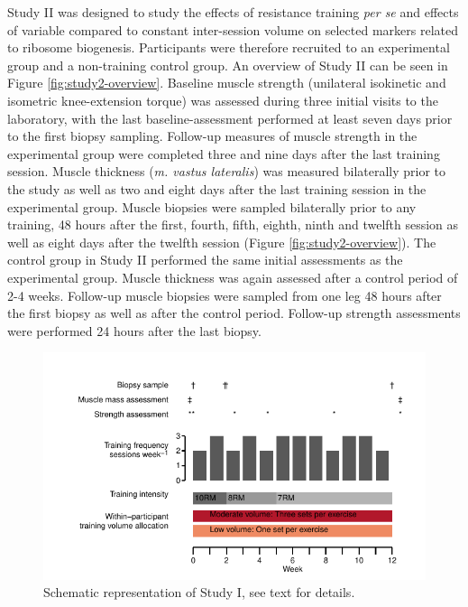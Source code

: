 \documentclass[twoside,10pt]{gihclass} %
\begin{document}
Study II was designed to study the effects of resistance training \emph{per se} and effects of variable compared to constant inter-session volume on selected markers related to ribosome biogenesis.
Participants were therefore recruited to an experimental group and a non-training control group.
An overview of Study II can be seen in Figure \ref{fig:study2-overview}.
Baseline muscle strength (unilateral isokinetic and isometric knee-extension torque) was assessed during three initial visits to the laboratory, with the last baseline-assessment performed at least seven days prior to the first biopsy sampling. Follow-up measures of muscle strength in the experimental group were completed three and nine days after the last training session.
Muscle thickness (\emph{m. vastus lateralis}) was measured bilaterally prior to the study as well as two and eight days after the last training session in the experimental group.
Muscle biopsies were sampled bilaterally prior to any training, 48 hours after the first, fourth, fifth, eighth, ninth and twelfth session as well as eight days after the twelfth session (Figure \ref{fig:study2-overview}).
The control group in Study II performed the same initial assessments as the experimental group. Muscle thickness was again assessed after a control period of 2-4 weeks.
Follow-up muscle biopsies were sampled from one leg 48 hours after the first biopsy as well as after the control period. Follow-up strength assessments were performed 24 hours after the last biopsy.
\begin{figure}

{\centering \includegraphics{thesis_files/figure-latex/study1-overview-1} 

}

\caption[Study I, schematic overview]{Schematic representation of Study I, see text for details.  }\label{fig:study1-overview}
\end{figure}
\end{document}
